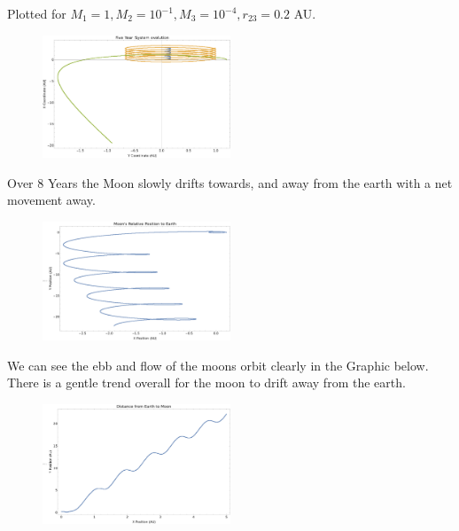 \documentclass{article}
\begin{document}
Plotted for $M_1 = 1, M_2 = 10^{-1}, M_3 = 10^{-4}, r_{23} = 0.2$ AU. 

\begin{figure}[!htb]
	\begin{center}
		\includegraphics[width=0.5\textwidth]{p1-4a.pdf}
	\end{center}
	\caption{}
\label{fig:qual}
\end{figure}
\FloatBarrier

Over 8 Years the Moon slowly drifts towards, and away from the earth with a net movement away.

\begin{figure}[!htb]
	\begin{center}
		\includegraphics[width=0.5\textwidth]{p1-4b.pdf}
	\end{center}
	\caption{}
\label{fig:qual}
\end{figure}
\FloatBarrier

We can see the ebb and flow of the moons orbit clearly in the Graphic below. There is a gentle trend overall for the moon to drift away from the earth.

\begin{figure}[!htb]
	\begin{center}
		\includegraphics[width=0.5\textwidth]{p1-4c.pdf}
	\end{center}
	\caption{}
\label{fig:qual}
\end{figure}
\FloatBarrier
\end{document}
